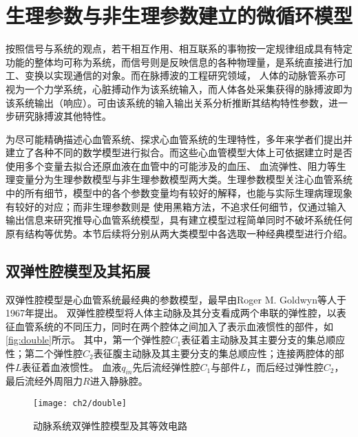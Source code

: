 \section{生理参数与非生理参数建立的微循环模型}
按照信号与系统的观点，若干相互作用、相互联系的事物按一定规律组成具有特定功能的整体均可称为系统，而信号则是反映信息的各种物理量，是系统直接进行加工、变换以实现通信的对象。而在脉搏波的工程研究领域，
人体的动脉管系亦可视为一个力学系统，心脏搏动作为该系统输入，而人体各处采集获得的脉搏波即为该系统输出（响应）。可由该系统的输入输出关系分析推断其结构特性参数，进一步研究脉搏波其他特性。\cite{PPGYY}

为尽可能精确描述心血管系统、探求心血管系统的生理特性，多年来学者们提出并建立了各种不同的数学模型进行拟合。而这些心血管模型大体上可依据建立时是否使用多个变量去拟合还原血液在血管中的可能涉及的血压、
血流弹性、阻力等生理变量分为生理参数模型与非生理参数模型两大类。生理参数模型关注心血管系统中的所有细节，模型中的各个参数变量均有较好的解释，也能与实际生理病理现象有较好的对应；而非生理参数则是
使用黑箱方法，不追求任何细节，仅通过输入输出信息来研究推导心血管系统模型，具有建立模型过程简单同时不破坏系统任何原有结构等优势。本节后续将分别从两大类模型中各选取一种经典模型进行介绍。
\subsection{双弹性腔模型及其拓展}
双弹性腔模型是心血管系统最经典的参数模型，最早由Roger M. Goldwyn等人\cite{Goldwyn1967}于1967年提出。
双弹性腔模型将人体主动脉及其分支看成两个串联的弹性腔，以表征血管系统的不同压力，同时在两个腔体之间加入了表示血液惯性的部件，如\autoref{fig:double}所示。
其中，第一个弹性腔$C_{1}$表征着主动脉及其主要分支的集总顺应性；第二个弹性腔$C_{2}$表征腹主动脉及其主要分支的集总顺应性；连接两腔体的部件$L$表征着血液惯性。
血液$q_{in}$先后流经弹性腔$C_{1}$与部件$L$，而后经过弹性腔$C_{2}$，最后流经外周阻力$R$进入静脉腔。
\begin{figure}[htbp]
    \centering
    \texttt{[image: ch2/double]}
    \caption{\label{fig:double}动脉系统双弹性腔模型及其等效电路}
\end{figure}

